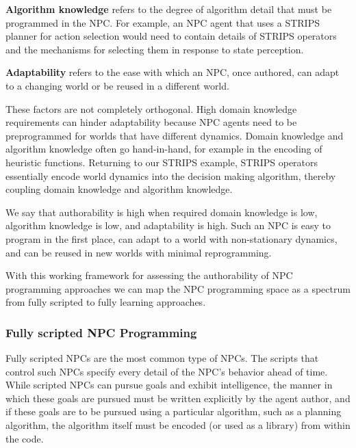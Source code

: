 {\bf Algorithm knowledge} refers to the degree of algorithm detail that must be programmed in the NPC.  For example, an NPC agent that uses a STRIPS planner for action selection would need to contain details of STRIPS operators and the mechanisms for selecting them in response to state perception.

{\bf Adaptability} refers to the ease with which an NPC, once authored, can adapt to a changing world or be reused in a different world.

These factors are not completely orthogonal.  High domain knowledge requirements can hinder adaptability because NPC agents need to be preprogrammed for worlds that have different dynamics.  Domain knowledge and algorithm knowledge often go hand-in-hand, for example in the encoding of heuristic functions.  Returning to our STRIPS example, STRIPS operators essentially encode world dynamics into the decision making algorithm, thereby coupling domain knowledge and algorithm knowledge.

We say that authorability is high when required domain knowledge is low, algorithm knowledge is low, and adaptability is high.  Such an NPC is easy to program in the first place, can adapt to a world with non-stationary dynamics, and can be reused in new worlds with minimal reprogramming.

With this working framework for assessing the authorability of NPC programming approaches we can map the NPC programming space as a spectrum from fully scripted to fully learning approaches.

\subsubsection{Fully scripted NPC Programming}

Fully scripted NPCs are the most common type of NPCs.  The scripts that control such NPCs specify every detail of the NPC's behavior ahead of time.  While scripted NPCs can pursue goals and exhibit intelligence, the manner in which these goals are pursued must be written explicitly by the agent author, and if these goals are to be pursued using a particular algorithm, such as a planning algorithm, the algorithm itself must be encoded (or used as a library) from within the code.

